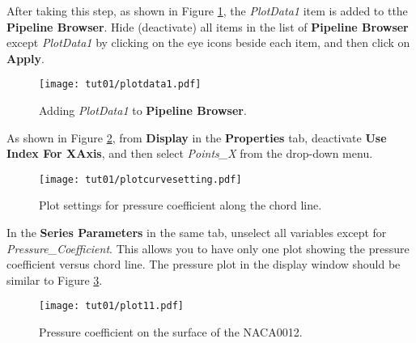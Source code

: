 After taking this step, as shown in Figure \ref{fig1:plotdata-list}, the \textit{PlotData1} item is added to tthe \textbf{Pipeline Browser}. Hide (deactivate) all items in the list of \textbf{Pipeline Browser} except \textit{PlotData1} by clicking on the eye icons beside each item, and then click on \textbf{Apply}.
\begin{figure}[htbp]
    \centering
    \texttt{[image: tut01/plotdata1.pdf]}
    \caption{Adding \textit{PlotData1} to \textbf{Pipeline Browser}.}
    \label{fig1:plotdata-list}
\end{figure}
As shown in Figure \ref{fig1:pointsx}, from \textbf{Display} in the \textbf{Properties} tab, deactivate \textbf{Use Index For XAxis}, and then select \textit{Points\_X} from the drop-down menu. 
\begin{figure}[htbp]
    \centering
    \texttt{[image: tut01/plotcurvesetting.pdf]}
    \caption{Plot settings for pressure coefficient along the chord line.}
    \label{fig1:pointsx}
\end{figure}
In the \textbf{Series Parameters} in the same tab, unselect all variables except for \textit{Pressure\_Coefficient}. This allows you to have only one plot showing the pressure coefficient versus chord line. The pressure plot in the display window should be similar to Figure \ref{fig1:surface_pressure}.
\begin{figure}[htbp]
    \centering
    \texttt{[image: tut01/plot11.pdf]}
    \caption{Pressure coefficient on the surface of the NACA0012.}
    \label{fig1:surface_pressure}
\end{figure}

